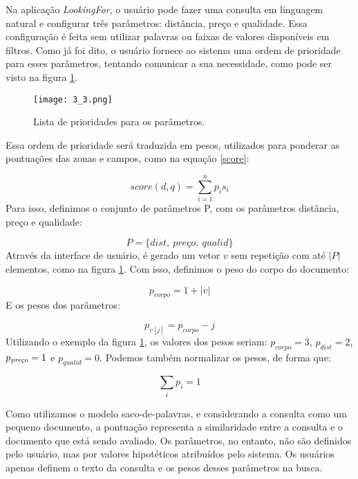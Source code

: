 Na aplicação \emph{LookingFor}, o usuário pode fazer uma consulta em linguagem natural e configurar três parâmetros: distância, preço e qualidade. Essa configuração é feita sem utilizar palavras ou faixas de valores disponíveis em filtros. Como já foi dito, o usuário fornece ao sistema uma ordem de prioridade para esses parâmetros, tentando comunicar a sua necessidade, como pode ser visto na figura \ref{fig:listprior}. 

\begin{figure}[!h]
  \centering
  \texttt{[image: 3\_3.png]} 
  \caption{Lista de prioridades para os parâmetros.}
  \label{fig:listprior} 
\end{figure}

Essa ordem de prioridade será traduzida em pesos, utilizados para ponderar as pontuações das zonas e campos, como na equação \ref{score}:

\begin{displaymath}
	score(d, q) = \sum_{i = 1}^n p_{i} s_{i}
\end{displaymath}
%
Para isso, definimos o conjunto de parâmetros P, com os parâmetros distância, preço e qualidade:

\begin{displaymath}
	P = \{dist,\ \textit{pre\c{c}o}, \ qualid\}
\end{displaymath}
%
Através da interface de usuário, é gerado um vetor $v$ sem repetição com até $|P|$ elementos, como na figura \ref{fig:listprior}. Com isso, definimos o peso do corpo do documento:

\begin{displaymath}
	p_{corpo} = 1 + |v|
\end{displaymath}
%
E os pesos dos parâmetros:

\begin{displaymath}
	p_{v[j]} = p_{corpo} - j
\end{displaymath}
%
Utilizando o exemplo da figura \ref{fig:listprior}, os valores dos pesos seriam: $p_{corpo}=3$, $p_{dist}=2$, $p_{\textit{\scriptsize pre\c{c}o}}=1$ e $p_{qualid}=0$. Podemos também normalizar os pesos, de forma que:

\begin{displaymath}
	\sum_{i} p_{i} = 1
\end{displaymath}

Como utilizamos o modelo saco-de-palavras, e considerando a consulta como um pequeno documento, a pontuação representa a similaridade entre a consulta e o documento que está sendo avaliado. Os parâmetros, no entanto, não são definidos pelo usuário, mas por valores hipotéticos atribuídos pelo sistema. Os usuários apenas definem o texto da consulta e os pesos desses parâmetros na busca.

